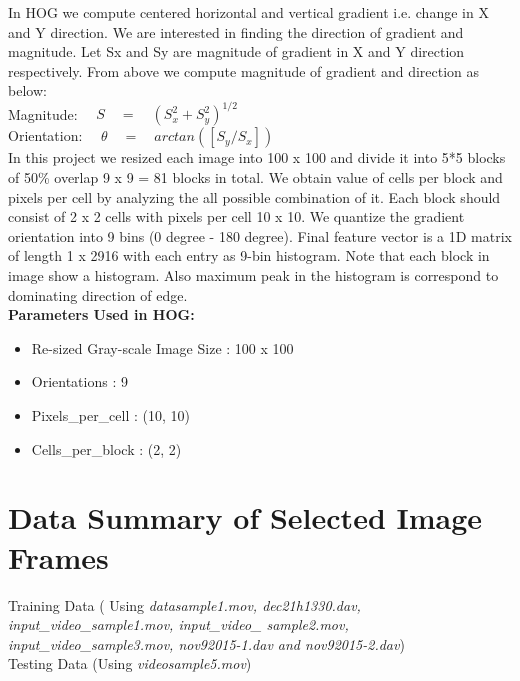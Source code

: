 \documentclass[paper=a4, fontsize=11pt]{scrartcl}
\numberwithin{equation}{section}		%
\numberwithin{figure}{section}			%
\numberwithin{table}{section}				%
\begin{document}
In HOG we compute centered horizontal and vertical gradient i.e. change in X and Y direction. We are interested in finding the direction of gradient and magnitude. Let Sx and Sy are magnitude of gradient in X and Y direction respectively. From above we compute magnitude of gradient and direction as below:\\

\noindent Magnitude:  $\quad S \quad= \quad(S_x^2 + S_y^2)^ {1/2}$\\
Orientation: $\quad \theta \quad= \quad arctan([S_y/S_x])$\\

\noindent In this project we resized each image into 100 x 100 and divide it into 5*5 blocks of 50\% overlap 9 x 9 = 81 blocks in total. We obtain value of cells per block and pixels per cell by analyzing the all possible combination of it. Each block should consist of 2 x 2 cells with pixels per cell 10 x 10. We quantize the gradient orientation into 9 bins (0 degree - 180 degree). Final feature vector is a 1D matrix of length 1 x 2916 with each entry as 9-bin histogram. Note that each block in image show a histogram. Also maximum peak in the histogram is correspond to dominating direction of edge. \\

\noindent \textbf{Parameters Used in HOG:}
\begin{itemize} \setlength\itemsep{-5pt}
\item Re-sized Gray-scale Image Size 	: 	100 x 100
\item Orientations  \hspace{2.82cm}	: 	9
\item Pixels\_per\_cell		\hspace{2.47cm}	:	(10, 10)
\item Cells\_per\_block		\hspace{2.32cm}	:	(2, 2)
\end{itemize}

\section{\textbf{Data Summary of Selected Image Frames}}

Training Data ( Using \textit{datasample1.mov, dec21h1330.dav, input\_video\_sample1.mov, input\_video\_ sample2.mov, input\_video\_sample3.mov, nov92015-1.dav and nov92015-2.dav})\\
Testing Data (Using \textit{videosample5.mov})
\end{document}
